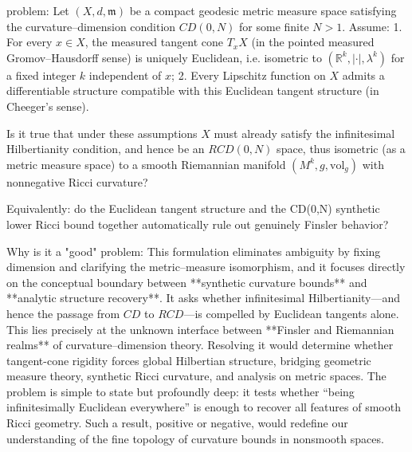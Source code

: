 problem:  
Let \((X,d,\mathfrak{m})\) be a compact geodesic metric measure space satisfying the curvature–dimension condition \(CD(0,N)\) for some finite \(N>1\).  
Assume:  
1. For every \(x\in X\), the measured tangent cone \(T_xX\) (in the pointed measured Gromov–Hausdorff sense) is uniquely Euclidean, i.e. isometric to \((\mathbb{R}^k,|\cdot|,\lambda^k)\) for a fixed integer \(k\) independent of \(x\);  
2. Every Lipschitz function on \(X\) admits a differentiable structure compatible with this Euclidean tangent structure (in Cheeger’s sense).  

Is it true that under these assumptions \(X\) must already satisfy the infinitesimal Hilbertianity condition, and hence be an \(RCD(0,N)\) space, thus isometric (as a metric measure space) to a smooth Riemannian manifold \((M^k,g,\mathrm{vol}_g)\) with nonnegative Ricci curvature?  

Equivalently: do the Euclidean tangent structure and the CD(0,N) synthetic lower Ricci bound together automatically rule out genuinely Finsler behavior?  

Why is it a "good" problem:  
This formulation eliminates ambiguity by fixing dimension and clarifying the metric–measure isomorphism, and it focuses directly on the conceptual boundary between **synthetic curvature bounds** and **analytic structure recovery**.  
It asks whether infinitesimal Hilbertianity—and hence the passage from \(CD\) to \(RCD\)—is compelled by Euclidean tangents alone. This lies precisely at the unknown interface between **Finsler and Riemannian realms** of curvature–dimension theory.  
Resolving it would determine whether tangent-cone rigidity forces global Hilbertian structure, bridging geometric measure theory, synthetic Ricci curvature, and analysis on metric spaces. The problem is simple to state but profoundly deep: it tests whether “being infinitesimally Euclidean everywhere” is enough to recover all features of smooth Ricci geometry. Such a result, positive or negative, would redefine our understanding of the fine topology of curvature bounds in nonsmooth spaces.